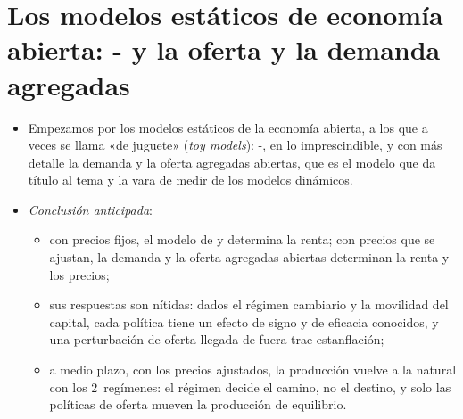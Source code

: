 \documentclass[11pt]{article}
\begin{document}
\section{Los modelos estáticos de economía abierta:\cortetitulo{} - y la oferta y la demanda agregadas}\label{sec:estatico}

\begin{itemize}
\item Empezamos por los modelos estáticos de la economía abierta, a los que a veces se llama «de juguete» (\emph{toy models}): -, en lo imprescindible, y con más detalle la demanda y la oferta agregadas abiertas, que es el modelo que da título al tema y la vara de medir de los modelos dinámicos.
\item \emph{Conclusión anticipada}:
  \begin{itemize}
  \item con precios fijos, el modelo de  y  determina la renta; con precios que se ajustan, la demanda y la oferta agregadas abiertas determinan la renta y los precios;
  \item sus respuestas son nítidas: dados el régimen cambiario y la movilidad del capital, cada política tiene un efecto de signo y de eficacia conocidos, y una perturbación de oferta llegada de fuera trae estanflación;
  \item a medio plazo, con los precios ajustados, la producción vuelve a la natural con los 2~regímenes: el régimen decide el camino, no el destino, y solo las políticas de oferta mueven la producción de equilibrio.
  \end{itemize}
\end{itemize}
\end{document}
